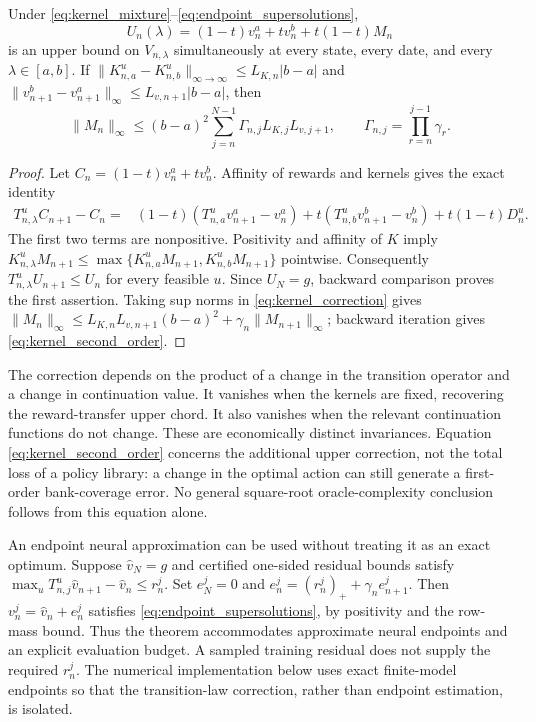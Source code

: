 \begin{theorem}
\label{thm:corrected_chord}
Under \eqref{eq:kernel_mixture}--\eqref{eq:endpoint_supersolutions},
\begin{equation}
 U_n(\lambda)=(1-t)v_n^a+tv_n^b+t(1-t)M_n
 \label{eq:corrected_upper}
\end{equation}
is an upper bound on $V_{n,\lambda}$ simultaneously at every state, every date, and every $\lambda\in[a,b]$. If
$\|K_{n,a}^u-K_{n,b}^u\|_{\infty\to\infty}\leq L_{K,n}|b-a|$ and
$\|v_{n+1}^b-v_{n+1}^a\|_\infty\leq L_{v,n+1}|b-a|$, then
\begin{equation}
 \|M_n\|_\infty\leq (b-a)^2
 \sum_{j=n}^{N-1}\Gamma_{n,j}L_{K,j}L_{v,j+1},
 \qquad \Gamma_{n,j}=\prod_{r=n}^{j-1}\gamma_r.
 \label{eq:kernel_second_order}
\end{equation}
\end{theorem}
\begin{proof}
Let $C_n=(1-t)v_n^a+tv_n^b$. Affinity of rewards and kernels gives the exact identity
\begin{align*}
 T_{n,\lambda}^u C_{n+1}-C_n
 ={}&(1-t)(T_{n,a}^u v_{n+1}^a-v_n^a)
       +t(T_{n,b}^u v_{n+1}^b-v_n^b)+t(1-t)D_n^u.
\end{align*}
The first two terms are nonpositive. Positivity and affinity of $K$ imply
$K_{n,\lambda}^u M_{n+1}\leq
\max\{K_{n,a}^uM_{n+1},K_{n,b}^uM_{n+1}\}$ pointwise.
Consequently $T_{n,\lambda}^u U_{n+1}\leq U_n$ for every feasible $u$.
Since $U_N=g$, backward comparison proves the first assertion. Taking sup norms in \eqref{eq:kernel_correction} gives
$\|M_n\|_\infty\leq L_{K,n}L_{v,n+1}(b-a)^2+\gamma_n\|M_{n+1}\|_\infty$;
backward iteration gives \eqref{eq:kernel_second_order}.
\end{proof}

The correction depends on the product of a change in the transition operator and a change in continuation value. It vanishes when the kernels are fixed, recovering the reward-transfer upper chord. It also vanishes when the relevant continuation functions do not change. These are economically distinct invariances. Equation \eqref{eq:kernel_second_order} concerns the additional upper correction, not the total loss of a policy library: a change in the optimal action can still generate a first-order bank-coverage error. No general square-root oracle-complexity conclusion follows from this equation alone.

An endpoint neural approximation can be used without treating it as an exact optimum. Suppose $\widehat v_N=g$ and certified one-sided residual bounds satisfy
$\max_u T_{n,j}^u\widehat v_{n+1}-\widehat v_n\leq r_n^j$.
Set $e_N^j=0$ and $e_n^j=(r_n^j)_++\gamma_ne_{n+1}^j$. Then
$v_n^j=\widehat v_n+e_n^j$ satisfies \eqref{eq:endpoint_supersolutions}, by positivity and the row-mass bound. Thus the theorem accommodates approximate neural endpoints and an explicit evaluation budget. A sampled training residual does not supply the required $r_n^j$. The numerical implementation below uses exact finite-model endpoints so that the transition-law correction, rather than endpoint estimation, is isolated.

